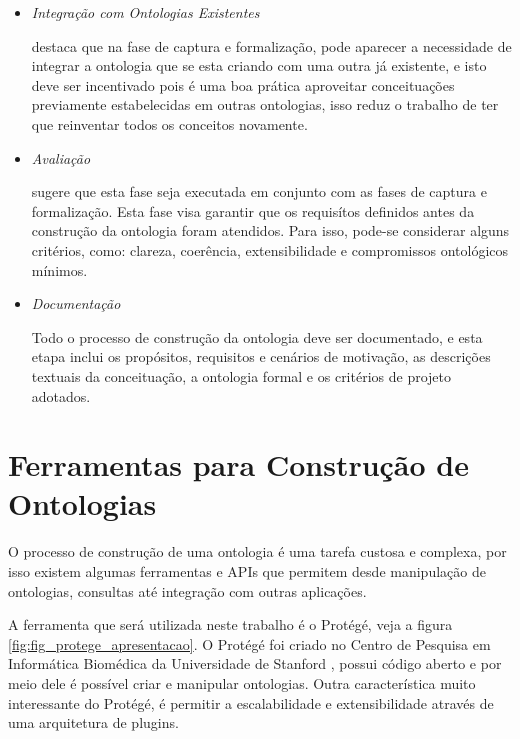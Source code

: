 \begin{itemize}
    \item \textit{Integração com Ontologias Existentes}
    
    \cite{falbo1998integracao} destaca que na fase de captura e formalização,
    pode aparecer a necessidade de integrar a ontologia que se esta criando com
    uma outra já existente, e isto deve ser incentivado pois é uma boa prática 
    aproveitar conceituações previamente estabelecidas em outras ontologias, 
    isso reduz o trabalho de ter que reinventar todos os conceitos novamente.
    
    \item \textit{Avaliação}
    
    \cite{guizzardidesenvolvimento} sugere que esta fase seja executada em 
    conjunto com as fases de captura e formalização. Esta fase visa garantir 
    que os requisítos definidos antes da construção da ontologia foram atendidos.
    Para isso, pode-se considerar alguns critérios, como: clareza, coerência, 
    extensibilidade e compromissos ontológicos mínimos.
    
    \item \textit{Documentação}
    
    Todo o processo de construção da ontologia deve ser documentado, e esta etapa
    inclui os propósitos, requisitos e cenários de motivação, as descrições 
    textuais da conceituação, a ontologia formal e os critérios de projeto 
    adotados.
\end{itemize}

\section{Ferramentas para Construção de Ontologias}
\label{sec:ferramentas_para_construcao_de_ontologias}

O processo de construção de uma ontologia é uma tarefa custosa e complexa, por 
isso existem algumas ferramentas e APIs que permitem desde manipulação de 
ontologias, consultas até integração com outras aplicações.

A ferramenta que será utilizada neste trabalho é o Protégé, veja a figura 
\ref{fig:fig_protege_apresentacao}. O Protégé foi criado 
no Centro de Pesquisa em Informática Biomédica da Universidade de Stanford 
\cite{protege}, possui código aberto e por meio dele é possível criar e
manipular ontologias. Outra característica muito interessante do Protégé, 
é permitir a escalabilidade e extensibilidade através de uma arquitetura de 
plugins.

